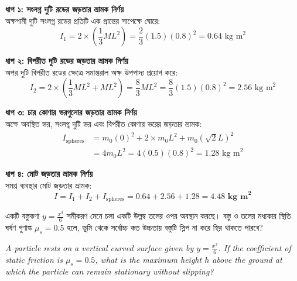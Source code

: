 \documentclass[12pt, a4paper]{article}
\begin{document}
\begin{tcolorbox}[solutionbox={সমাধান (Solution)}]
\noindent
\textbf{ধাপ ১: সংলগ্ন দুটি রডের জড়তার ভ্রামক নির্ণয়} \\
অক্ষগামী দুটি সংলগ্ন রডের প্রতিটি এক প্রান্তের সাপেক্ষে ঘোরে:
\[I_1 = 2 \times \left(\frac{1}{3} M L^2\right) = \frac{2}{3} (1.5) (0.8)^2 = 0.64\text{ kg m}^2\]

\vspace{0.5em}
\noindent\textbf{ধাপ ২: বিপরীত দুটি রডের জড়তার ভ্রামক নির্ণয়} \\
অপর দুটি বিপরীত রডের ক্ষেত্রে সমান্তরাল অক্ষ উপপাদ্য প্রয়োগ করে:
\[I_2 = 2 \times \left(\frac{1}{3} M L^2 + M L^2\right) = \frac{8}{3} M L^2 = \frac{8}{3} (1.5) (0.8)^2 = 2.56\text{ kg m}^2\]

\vspace{0.5em}
\noindent\textbf{ধাপ ৩: চার কোণার ভরগুলোর জড়তার ভ্রামক নির্ণয়} \\
অক্ষে অবস্থিত ভর, সংলগ্ন দুটি ভর এবং বিপরীত কোণার ভরের জড়তার ভ্রামক:
\begin{align*}
    I_{\text{spheres}} &= m_0(0)^2 + 2 \times m_0 L^2 + m_0 (\sqrt{2}L)^2 \\
    &= 4 m_0 L^2 = 4(0.5)(0.8)^2 = 1.28\text{ kg m}^2
\end{align*}

\vspace{0.5em}
\noindent\textbf{ধাপ ৪: মোট জড়তার ভ্রামক নির্ণয়} \\
সমগ্র ব্যবস্থার মোট জড়তার ভ্রামক:
\[I = I_1 + I_2 + I_{\text{spheres}} = 0.64 + 2.56 + 1.28 = \mathbf{4.48\text{ kg m}^2}\]
\end{tcolorbox}
\begin{tcolorbox}[questionbox={প্রশ্ন (Question) 36}]
\noindent
একটি বস্তুকণা $y = \frac{x^3}{6}$ সমীকরণ মেনে চলা একটি উল্লম্ব তলের ওপর অবস্থান করছে। বস্তু ও তলের মধ্যকার স্থিতি ঘর্ষণ গুণাঙ্ক $\mu_s = 0.5$ হলে, ভূমি থেকে সর্বোচ্চ কত উচ্চতায় বস্তুটি স্লিপ না করে স্থির থাকতে পারবে?
\vspace{0.8em}
\begin{english}
\noindent\textit{\color{darkgray}
A particle rests on a vertical curved surface given by $y = \frac{x^3}{6}$. If the coefficient of static friction is $\mu_s = 0.5$, what is the maximum height $h$ above the ground at which the particle can remain stationary without slipping?
}
\end{english}
\end{tcolorbox}
\end{document}
